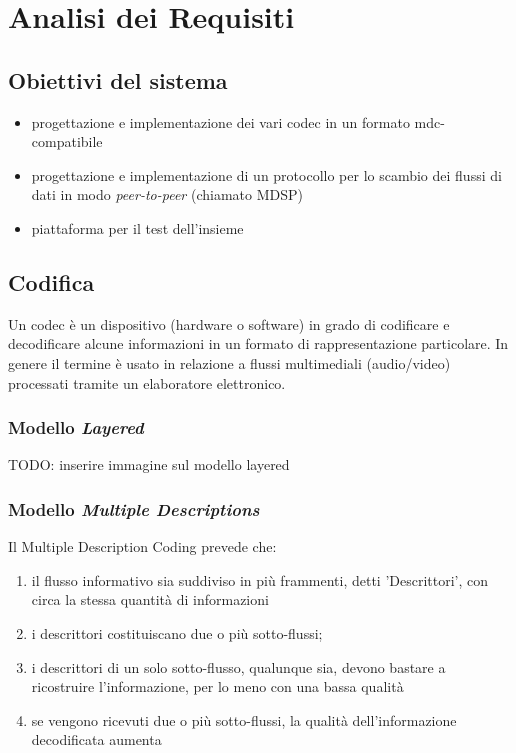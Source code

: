 \chapter{Analisi dei Requisiti}

\section{Obiettivi del sistema}


\begin{itemize}
\item progettazione e implementazione dei vari codec in un formato mdc-compatibile
\item progettazione e implementazione di un protocollo per lo scambio dei
flussi di dati in modo \emph{peer-to-peer} (chiamato MDSP)
\item piattaforma per il test dell'insieme
\end{itemize}


\section{Codifica}


Un codec è un dispositivo (hardware o software) in grado di codificare e decodificare alcune informazioni in un formato di rappresentazione particolare. In genere il termine è usato in relazione a flussi multimediali (audio/video) processati tramite un elaboratore elettronico.



\subsection{Modello \emph{Layered}}

TODO: inserire immagine sul modello layered

\subsection{Modello \emph{Multiple Descriptions}}

Il Multiple Description Coding prevede che:
\begin{enumerate}
\item il flusso informativo sia suddiviso in più frammenti, detti 'Descrittori', con circa la stessa quantità di informazioni
\item i descrittori costituiscano due o più sotto-flussi;
\item i descrittori di un solo sotto-flusso, qualunque sia, devono bastare a ricostruire l'informazione, per lo meno con una bassa qualità
\item se vengono ricevuti due o più sotto-flussi, la qualità dell'informazione decodificata aumenta 
\end{enumerate}

